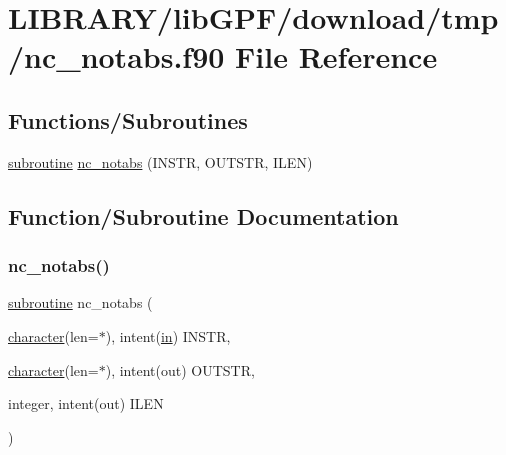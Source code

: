 \hypertarget{nc__notabs_8f90}{}\section{L\+I\+B\+R\+A\+R\+Y/lib\+G\+P\+F/download/tmp/nc\+\_\+notabs.f90 File Reference}
\label{nc__notabs_8f90}
\subsection*{Functions/\+Subroutines}
\begin{DoxyCompactItemize}
\item 
\hyperlink{M__stopwatch_83_8txt_acfbcff50169d691ff02d4a123ed70482}{subroutine} \hyperlink{nc__notabs_8f90_abf42180f28920ea39bb78c90f543b436}{nc\+\_\+notabs} (I\+N\+S\+TR, O\+U\+T\+S\+TR, I\+L\+EN)
\end{DoxyCompactItemize}


\subsection{Function/\+Subroutine Documentation}
\mbox{\label{nc__notabs_8f90_abf42180f28920ea39bb78c90f543b436}} 
\subsubsection{\texorpdfstring{nc\+\_\+notabs()}{nc\_notabs()}}
{\footnotesize\ttfamily \hyperlink{M__stopwatch_83_8txt_acfbcff50169d691ff02d4a123ed70482}{subroutine} nc\+\_\+notabs (\begin{DoxyParamCaption}\item[{\hyperlink{option__stopwatch_83_8txt_abd4b21fbbd175834027b5224bfe97e66}{character}(len=$\ast$), intent(\hyperlink{M__journal_83_8txt_afce72651d1eed785a2132bee863b2f38}{in})}]{I\+N\+S\+TR,  }\item[{\hyperlink{option__stopwatch_83_8txt_abd4b21fbbd175834027b5224bfe97e66}{character}(len=$\ast$), intent(out)}]{O\+U\+T\+S\+TR,  }\item[{integer, intent(out)}]{I\+L\+EN }\end{DoxyParamCaption})}

